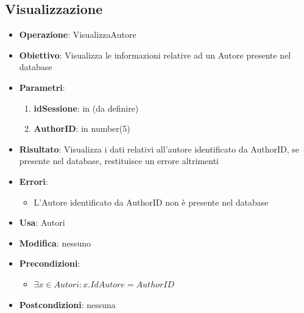 \documentclass[a4paper,11pt]{article}
\begin{document}
\subsection{Visualizzazione}
\begin{itemize}
	\item \textbf{Operazione}: VisualizzaAutore
	\item \textbf{Obiettivo}: Visualizza le informazioni relative ad un Autore presente nel database
	\item \textbf{Parametri}:
	\begin{enumerate}
		\item \textbf{idSessione}: in (da definire)
		\item \textbf{AuthorID}: in number(5)
	\end{enumerate}
	\item \textbf{Risultato}: Visualizza i dati relativi all'autore identificato da AuthorID, se presente nel database, restituisce un errore altrimenti
	\item \textbf{Errori}: 
	\begin{itemize}
		\item L'Autore identificato da AuthorID non è presente nel database
	\end{itemize}
	\item \textbf{Usa}: Autori
	\item \textbf{Modifica}: nessuno
	\item \textbf{Precondizioni}:
	\begin{itemize}
		\item $\exists x \in Autori : x.IdAutore = AuthorID$
	\end{itemize}
	\item \textbf{Postcondizioni}: nessuna
\end{itemize}

\end{document}
